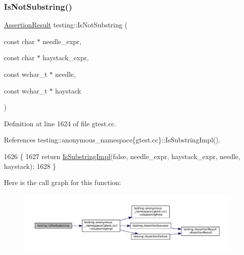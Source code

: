 \subsubsection{\texorpdfstring{Is\+Not\+Substring()}{IsNotSubstring()}\hspace{0.1cm}{\footnotesize\ttfamily [2/3]}}
{\footnotesize\ttfamily \hyperlink{classtesting_1_1AssertionResult}{Assertion\+Result} testing\+::\+Is\+Not\+Substring (\begin{DoxyParamCaption}\item[{const char $\ast$}]{needle\+\_\+expr,  }\item[{const char $\ast$}]{haystack\+\_\+expr,  }\item[{const wchar\+\_\+t $\ast$}]{needle,  }\item[{const wchar\+\_\+t $\ast$}]{haystack }\end{DoxyParamCaption})}



Definition at line 1624 of file gtest.\+cc.



References testing\+::anonymous\+\_\+namespace\{gtest.\+cc\}\+::\+Is\+Substring\+Impl().


\begin{DoxyCode}
1626                                                     \{
1627   \textcolor{keywordflow}{return} \hyperlink{namespacetesting_1_1anonymous__namespace_02gtest_8cc_03_a0e1cb1e2b03a87a9c893322e4caab670}{IsSubstringImpl}(\textcolor{keyword}{false}, needle\_expr, haystack\_expr, needle, haystack);
1628 \}
\end{DoxyCode}
Here is the call graph for this function\+:
\nopagebreak
\begin{figure}[H]
\begin{center}
\leavevmode
\includegraphics[width=350pt]{namespacetesting_a53e5c6e91ea429c43de7f4f57e33d166_cgraph}
\end{center}
\end{figure}
\mbox{\label{namespacetesting_abe7b3fa1c9528745f934d4a14155ea87}} 
